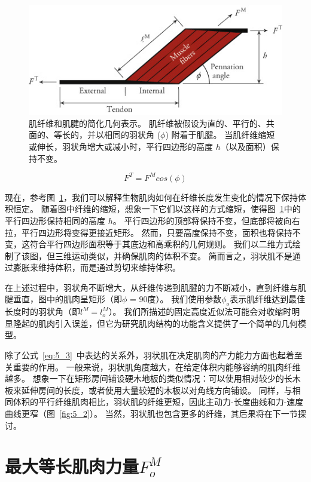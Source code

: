 \begin{figure}[!htb]
	\centering
	\includegraphics[width=0.75\linewidth]{chap5/5_4}
	\caption{肌纤维和肌腱的简化几何表示。
		肌纤维被假设为直的、平行的、共面的、等长的，并以相同的羽状角 ($\phi$) 附着于肌腱。
			当肌纤维缩短或伸长，羽状角增大或减小时，平行四边形的高度 $h$（以及面积）保持不变\cite{zajac1989muscle}。 \label{fig:5_4}}
\end{figure}

\begin{equation}
	F^T = F^M cos(\phi) 
	\label{eq:5_3}
\end{equation}

现在，参考图~\ref{fig:5_4}，我们可以解释生物肌肉如何在纤维长度发生变化的情况下保持体积恒定。
随着图中纤维的缩短，想象一下它们以这样的方式缩短，使得图~\ref{fig:5_4}中的平行四边形保持相同的高度 $h$。
平行四边形的顶部将保持不变，但底部将被向右拉，平行四边形将变得更接近矩形。
然而，只要高度保持不变，面积也将保持不变，这符合平行四边形面积等于其底边和高乘积的几何规则。
我们以二维方式绘制了该图，但三维运动类似，并确保肌肉的体积不变。
简而言之，羽状肌不是通过膨胀来维持体积，而是通过剪切来维持体积。


在上述过程中，羽状角不断增大，从纤维传递到肌腱的力不断减小，直到纤维与肌腱垂直，图中的肌肉呈矩形（即$\phi$ = 90度）。
我们使用参数$\phi_o$表示肌纤维达到最佳长度时的羽状角（即$l^M = l_o^M$）。
我们所描述的固定高度近似法可能会对收缩时明显隆起的肌肉引入误差，但它为研究肌肉结构的功能含义提供了一个简单的几何模型。


除了公式~\ref{eq:5_3}~中表达的关系外，羽状肌在决定肌肉的产力能力方面也起着至关重要的作用。
一般来说，羽状肌角度越大，在给定体积内能够容纳的肌肉纤维越多。
想象一下在矩形房间铺设硬木地板的类似情况：可以使用相对较少的长木板来延伸房间的长度，或者使用大量较短的木板以对角线方向铺设。
同样，与相同体积的平行纤维肌肉相比，羽状肌的纤维更短，因此主动力-长度曲线和力-速度曲线更窄（图~\ref{fig:5_2}）。
当然，羽状肌也包含更多的纤维，其后果将在下一节探讨。



\section{最大等长肌肉力量$F_o^M$}

